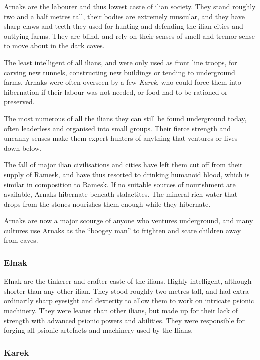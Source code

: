 Arnaks are the labourer and thus lowest caste of ilian society. They stand
roughly two and a half metres tall, their bodies are extremely muscular, and
they have sharp claws and teeth they used for hunting and defending the ilian
cities and outlying farms. They are blind, and rely on their senses of smell
and tremor sense to move about in the dark caves.

The least intelligent of all ilians, and were only used as front line troops,
for carving new tunnels, constructing new buildings or tending to underground
farms. Arnaks were often overseen by a few \emph{Karek}, who could force them
into hibernation if their labour was not needed, or food had to be rationed or
preserved.

The most numerous of all the ilians they can still be found underground today,
often leaderless and organised into small groups. Their fierce strength and
uncanny senses make them expert hunters of anything that ventures or lives down
below.

The fall of major ilian civilisations and cities have left them cut off from
their supply of Ramesk, and have thus resorted to drinking humanoid blood,
which is similar in composition to Ramesk. If no suitable sources of nourishment
are available, Arnaks hibernate beneath stalactites. The mineral rich water
that drops from the stones nourishes them enough while they hibernate.

Arnaks are now a major scourge of anyone who ventures underground, and many
cultures use Arnaks as the ``boogey man'' to frighten and scare children away
from caves.

\subsubsection{Elnak}
\label{sec:Elnak}

Elnak are the tinkerer and crafter caste of the ilians. Highly intelligent,
although shorter than any other ilian. They stood roughly two metres tall, and
had extra-ordinarily sharp eyesight and dexterity to allow them to work on
intricate psionic machinery. They were leaner than other ilians, but made up
for their lack of strength with advanced psionic powers and abilities. They
were responsible for forging all psionic artefacts and machinery used by the
Ilians.

\subsubsection{Karek}
\label{sec:Karek}

